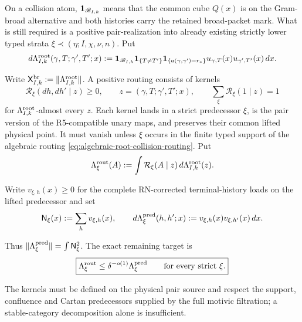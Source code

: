\documentclass[11pt]{article}
\begin{document}
On a collision atom,
\({\bf1}_{\mathscr B_{I,k}}\) means that the common cube \(Q(x)\) is on the
Gram-broad alternative and both histories carry the retained broad-packet
mark.  What is still required is a positive
pair-realization into already existing strictly lower typed strata
\(\xi\prec(\eta;I,\chi,\nu,n)\).  Put
\begin{equation}\label{eq:root-collision-measure}
 d\Lambda^{\rm root}_{I,k}
 (\gamma,T;\gamma',T';x)
 :={\bf1}_{\mathscr B_{I,k}}
   {\bf1}_{\{T\ne T'\}}
   {\bf1}_{\{a(\gamma,\gamma')=r_\ast\}}
   u_{\gamma,T}(x)u_{\gamma',T'}(x)\,dx.
\end{equation}

Write \(\mathsf X^{\rm br}_{I,k}:=\|\Lambda^{\rm root}_{I,k}\|\).  A
positive routing consists of kernels
\[
 \mathcal R_\xi(dh,dh'\mid z)\ge0,
 \qquad z=(\gamma,T;\gamma',T';x),
 \qquad
 \sum_\xi\mathcal R_\xi(1\mid z)=1
\]
for \(\Lambda^{\rm root}_{I,k}\)-almost every \(z\).  Each kernel lands in a
strict predecessor \(\xi\), is the pair version of the R5-compatible unary
maps, and preserves their common lifted physical point.  It must vanish unless
\(\xi\) occurs in the finite typed support of the algebraic routing
\eqref{eq:algebraic-root-collision-routing}.  Put
\[
 \Lambda_\xi^{\rm rout}(A)
 :=\int\mathcal R_\xi(A\mid z)\,d\Lambda^{\rm root}_{I,k}(z).
\]

Write \(v_{\xi,h}(x)\ge0\) for the complete RN-corrected terminal-history
loads on the lifted predecessor and set
\begin{equation}\label{eq:predecessor-pair-measure}
 \mathsf N_\xi(x):=\sum_hv_{\xi,h}(x),
 \qquad
 d\Lambda_\xi^{\rm pred}(h,h';x)
 :=v_{\xi,h}(x)v_{\xi,h'}(x)\,dx.
\end{equation}

Thus \(\|\Lambda_\xi^{\rm pred}\|=\int\mathsf N_\xi^2\).  The exact remaining
target is
\begin{equation}\label{eq:root-collision-realization-target}
 \boxed{
 \Lambda_\xi^{\rm rout}
 \le \delta^{-o(1)}\Lambda_\xi^{\rm pred}
 \qquad\text{for every strict }\xi.}
\end{equation}

The kernels must be defined on the physical pair source and respect the
support, confluence and Cartan predecessors supplied by the full motivic
filtration; a stable-category decomposition alone is insufficient.
\end{document}
